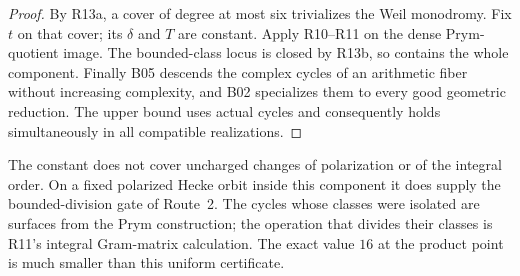 \begin{proof}
By R13a, a cover of degree at most six trivializes the Weil monodromy.
Fix $t$ on that cover; its $\delta$ and $T$ are constant. Apply R10--R11
on the dense Prym-quotient image. The bounded-class locus is closed by
R13b, so contains the whole component. Finally B05 descends the complex
cycles of an arithmetic fiber without increasing complexity, and B02
specializes them to every good geometric reduction. The upper bound
uses actual cycles and consequently holds simultaneously in all
compatible realizations.
\end{proof}

The constant does not cover uncharged changes of polarization or of
the integral order. On a fixed polarized Hecke orbit inside this
component it does supply the bounded-division gate of Route~2. The
cycles whose classes were isolated are surfaces from the Prym
construction; the operation that divides their classes is R11's
integral Gram-matrix calculation. The exact value $16$ at the product
point is much smaller than this uniform certificate.
